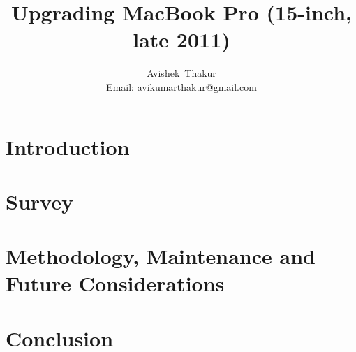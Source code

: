 \documentclass[12pt, journal, a4paper]{IEEEtran}
\newcommand{\model}{MacBook Pro (15-inch, late 2011)}
\begin{document}
\title{Upgrading \model}
\author{Avishek~Thakur\\%
Email: avikumarthakur@gmail.com
}

\twocolumn[
  \begin{@twocolumnfalse}
	\maketitle
	\begin{abstract}
	  \label{abstract}
	  
    \end{abstract}
    \tableofcontents
  \end{@twocolumnfalse}
  ]
\clearpage

\section{Introduction}
\label{intro}


\section{Survey}
\label{survey}



\section{Methodology, Maintenance and Future Considerations}
\label{mmf}


\section{Conclusion}
\label{conclusion}




\printbibliography
	
\end{document}
